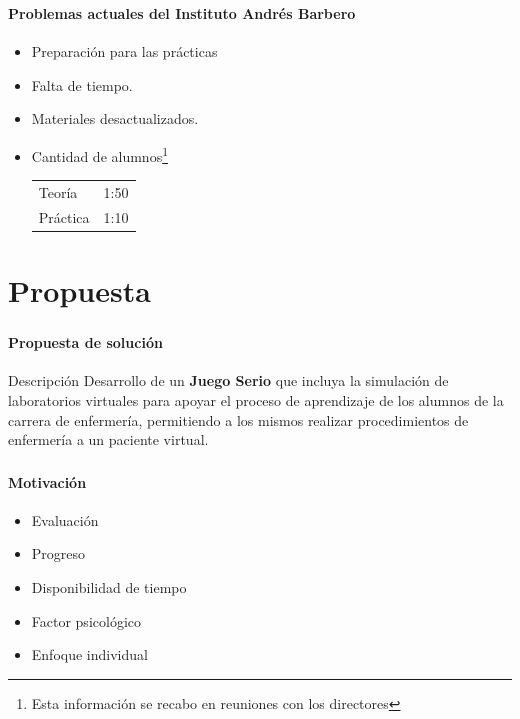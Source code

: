 \begin{frame}
\frametitle{\pagetitle}
\framesubtitle{Problemas actuales del Instituto Andrés Barbero}
\begin{itemize}[<+->]
\item Preparación para las prácticas
\item Falta de tiempo.
\item Materiales desactualizados.
\item Cantidad de alumnos\footnote{Esta información se recabo en reuniones con
        los directores}

    \bigskip

    \begin{tabular}{lr}
        \tabitem{} Teoría   & 1:50 \\
        \tabitem{} Práctica & 1:10 \\
    \end{tabular}
\end{itemize}
\end{frame}

\section{Propuesta}
\setcounter{sectiontotal}{5}

\begin{frame}
\frametitle{\pagetitle}
\framesubtitle{Propuesta de solución}
\begin{block}{Descripción}
\centering
Desarrollo de un \textbf{Juego Serio} que incluya la simulación de
laboratorios virtuales para apoyar el proceso de aprendizaje de los alumnos
de la carrera de enfermería, permitiendo a los mismos realizar
procedimientos de enfermería a un paciente virtual.
\end{block}
\end{frame}

\begin{frame}
\frametitle{\pagetitle}
\framesubtitle{Motivación}

\begin{itemize}[<+->]
\item Evaluación
\item Progreso
\item Disponibilidad de tiempo
\item Factor psicológico
\item Enfoque individual
\end{itemize}
\end{frame}

